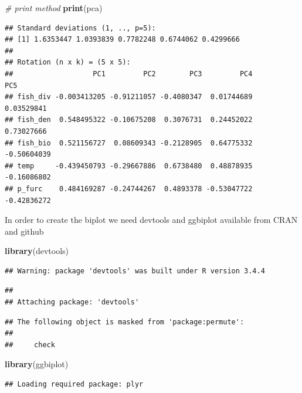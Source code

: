 \documentclass[]{article}
\newenvironment{Shaded}{\begin{snugshade}}{\end{snugshade}}
\newcommand{\KeywordTok}[1]{\textcolor[rgb]{0.13,0.29,0.53}{\textbf{#1}}}
\newcommand{\CommentTok}[1]{\textcolor[rgb]{0.56,0.35,0.01}{\textit{#1}}}
\newcommand{\NormalTok}[1]{#1}
\begin{document}
\begin{Shaded}
\begin{Highlighting}[]
\CommentTok{# print method}
\KeywordTok{print}\NormalTok{(pca)}
\end{Highlighting}
\end{Shaded}

\begin{verbatim}
## Standard deviations (1, .., p=5):
## [1] 1.6353447 1.0393839 0.7782248 0.6744062 0.4299666
## 
## Rotation (n x k) = (5 x 5):
##                   PC1         PC2        PC3         PC4         PC5
## fish_div -0.003413205 -0.91211057 -0.4080347  0.01744689  0.03529841
## fish_den  0.548495322 -0.10675208  0.3076731  0.24452022  0.73027666
## fish_bio  0.521156727  0.08609343 -0.2128905  0.64775332 -0.50604039
## temp     -0.439450793 -0.29667886  0.6738480  0.48878935 -0.16086802
## p_furc    0.484169287 -0.24744267  0.4893378 -0.53047722 -0.42836272
\end{verbatim}

In order to create the biplot we need devtools and ggbiplot available
from CRAN and github

\begin{Shaded}
\begin{Highlighting}[]
\KeywordTok{library}\NormalTok{(devtools)}
\end{Highlighting}
\end{Shaded}

\begin{verbatim}
## Warning: package 'devtools' was built under R version 3.4.4
\end{verbatim}

\begin{verbatim}
## 
## Attaching package: 'devtools'
\end{verbatim}

\begin{verbatim}
## The following object is masked from 'package:permute':
## 
##     check
\end{verbatim}

\begin{Shaded}
\begin{Highlighting}[]
\KeywordTok{library}\NormalTok{(ggbiplot)}
\end{Highlighting}
\end{Shaded}

\begin{verbatim}
## Loading required package: plyr
\end{verbatim}
\end{document}
